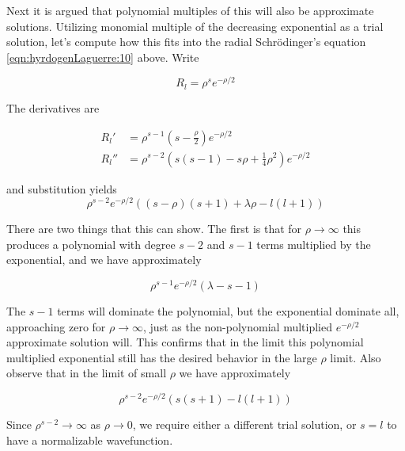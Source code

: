 Next it is argued that polynomial multiples of this will also be approximate solutions.  Utilizing monomial multiple of the decreasing exponential as a trial solution, let's compute how this fits into the radial Schr\"{o}dinger's equation \ref{eqn:hyrdogenLaguerre:10} above.  Write

\begin{equation}\label{eqn:hyrdogenLaguerre:15}
R_l = \rho^s e^{-\rho/2}
\end{equation}

The derivatives are

\begin{align*}
R_l' &= \rho^{s-1} \left( s -\frac{\rho}{2}\right) e^{-\rho/2} \\
R_l'' &=
\rho^{s-2}
\left( s (s-1) -s \rho +\frac{1}{4} \rho^2
\right)
e^{-\rho/2}
\end{align*}

and substitution yields
\begin{equation}\label{eqn:hyrdogenLaguerre:16}
\rho^{s-2}
e^{-\rho/2}
\left(
(s - \rho) (s+1)
+\lambda \rho
- l(l+1)
\right)
\end{equation}

There are two things that this can show.  The first is that for $\rho \rightarrow \infty$ this produces a polynomial with degree $s-2$ and $s-1$ terms multiplied by the exponential, and we have approximately

\begin{equation}\label{eqn:hyrdogenLaguerre:17}
\rho^{s-1}
e^{-\rho/2}
(\lambda - s - 1)
\end{equation}

The $s-1$ terms will dominate the polynomial, but the exponential dominate all, approaching zero for $\rho \rightarrow \infty$, just as the non-polynomial multiplied $e^{-\rho/2}$ approximate solution will.  This confirms that in the limit this polynomial multiplied exponential still has the desired behavior in the large $\rho$ limit.  Also observe that in the limit of small $\rho$ we have approximately

\begin{equation}\label{eqn:hyrdogenLaguerre:18}
\rho^{s-2}
e^{-\rho/2}
\left(
s (s+1) - l(l+1)
\right)
\end{equation}

Since $\rho^{s-2} \rightarrow \infty$ as $\rho \rightarrow 0$, we require either a different trial solution, or $s=l$ to have a normalizable wavefunction.

